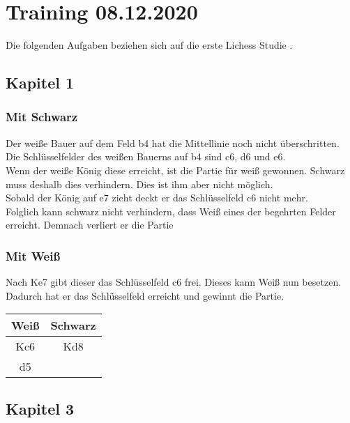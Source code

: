\chapter{Training 08.12.2020}
 Die folgenden Aufgaben beziehen sich auf die erste Lichess Studie \cite{Study1}.
 
\section{Kapitel 1}
\subsection{Mit Schwarz}



\links
Der weiße Bauer auf dem Feld b4 hat die Mittellinie noch nicht überschritten. \\
Die Schlüsselfelder des weißen Bauerns auf b4 sind c6, d6 und e6.\\
 Wenn der weiße König diese erreicht, ist die Partie für weiß gewonnen. Schwarz muss deshalb dies verhindern. Dies ist ihm aber nicht möglich. \\
 Sobald der König auf e7 zieht deckt er das Schlüsselfeld c6 nicht mehr. \\  Folglich kann schwarz nicht verhindern, dass Weiß eines der begehrten Felder erreicht. Demnach verliert er die Partie

\pagebreak

\subsection{Mit Weiß}


\links
Nach Ke7 gibt dieser das Schlüsselfeld c6 frei. Dieses kann Weiß nun besetzen. Dadurch hat er das Schlüsselfeld erreicht und gewinnt die Partie. \\

\centering
\begin{tabular}[h]{c|c}
	\textbf{Weiß}  & \textbf{Schwarz} \\
	\hline
	Kc6 & Kd8 \\
	d5 & \unterstreichen{1-0}
\end{tabular}


\section{Kapitel 3}

